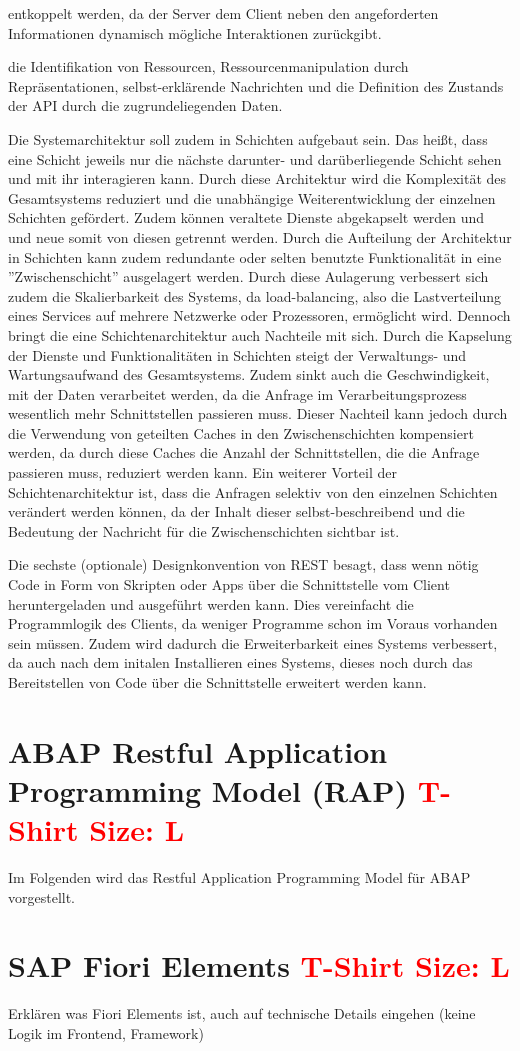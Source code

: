 entkoppelt werden, da der Server dem Client neben den angeforderten Informationen dynamisch mögliche Interaktionen zurückgibt.

die Identifikation von Ressourcen, Ressourcenmanipulation durch Repräsentationen, selbst-erklärende Nachrichten und die Definition des Zustands der API durch die zugrundeliegenden Daten.

Die Systemarchitektur soll zudem in Schichten aufgebaut sein. Das hei{\ss}t, dass eine Schicht jeweils nur die nächste darunter- und darüberliegende Schicht sehen und mit ihr interagieren kann. Durch diese Architektur wird die Komplexität des Gesamtsystems reduziert und die unabhängige Weiterentwicklung der einzelnen Schichten gefördert. Zudem können veraltete Dienste abgekapselt werden und und neue somit von diesen getrennt werden. Durch die Aufteilung der Architektur in Schichten kann zudem redundante oder selten benutzte Funktionalität in eine ''Zwischenschicht'' ausgelagert werden. Durch diese Aulagerung verbessert sich zudem die Skalierbarkeit des Systems, da load-balancing, also die Lastverteilung eines Services auf mehrere Netzwerke oder Prozessoren, ermöglicht wird. Dennoch bringt die eine Schichtenarchitektur auch Nachteile mit sich. Durch die Kapselung der Dienste und Funktionalitäten in Schichten steigt der Verwaltungs- und Wartungsaufwand des Gesamtsystems. Zudem sinkt auch die Geschwindigkeit, mit der Daten verarbeitet werden, da die Anfrage im Verarbeitungsprozess wesentlich mehr Schnittstellen passieren muss. Dieser Nachteil kann jedoch durch die Verwendung von geteilten Caches in den Zwischenschichten kompensiert werden, da durch diese Caches die Anzahl der Schnittstellen, die die Anfrage passieren muss, reduziert werden kann. Ein weiterer Vorteil der Schichtenarchitektur ist, dass die Anfragen selektiv von den einzelnen Schichten verändert werden können, da der Inhalt dieser selbst-beschreibend und die Bedeutung der Nachricht für die Zwischenschichten sichtbar ist.

Die sechste (optionale) Designkonvention von REST besagt, dass wenn nötig Code in Form von Skripten oder Apps über die Schnittstelle vom Client heruntergeladen und ausgeführt werden kann. Dies vereinfacht die Programmlogik des Clients, da weniger Programme schon im Voraus vorhanden sein müssen. Zudem wird dadurch die Erweiterbarkeit eines Systems verbessert, da auch nach dem initalen Installieren eines Systems, dieses noch durch das Bereitstellen von Code über die Schnittstelle erweitert werden kann. 

\section{ABAP Restful Application Programming Model (RAP) \textcolor{red}{T-Shirt Size: L}}

Im Folgenden wird das Restful Application Programming Model für ABAP vorgestellt.



\section{SAP Fiori Elements \textcolor{red}{T-Shirt Size: L}}

Erklären was Fiori Elements ist, auch auf technische Details eingehen (keine Logik im Frontend, Framework)